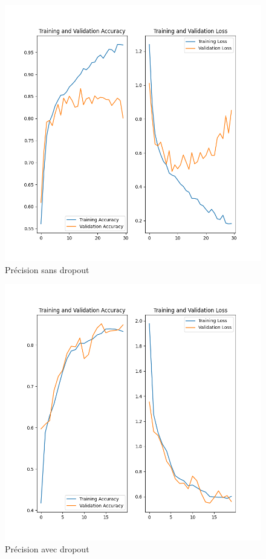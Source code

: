 \documentclass[12pt ,a4paper ]{article}
\begin{document}
\begin{multicols}{2}
\begin{figure}[H]
    \begin{center}
        \includegraphics[scale=0.4]{./img/figure_3.png}
    \end{center}
\caption{\small{Précision sans dropout}}
\end{figure}

\begin{figure}[H]
    \begin{center}
        \includegraphics[scale=0.4]{./img/figure_1.png}
    \end{center}
\caption{\small{Précision avec dropout}}
\end{figure}


\end{multicols}
\end{document}
